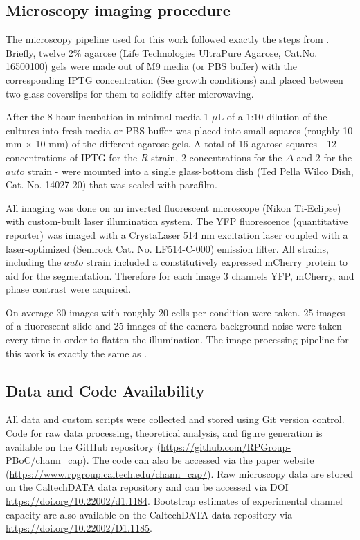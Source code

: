 \subsection{Microscopy imaging procedure}

The microscopy pipeline used for this work followed exactly the steps from
\cite{Razo-Mejia2018}. Briefly, twelve 2\% agarose (Life Technologies UltraPure
Agarose, Cat.No. 16500100) gels were made out of M9 media (or PBS buffer) with
the corresponding IPTG concentration (See growth conditions) and placed between
two glass coverslips for them to solidify after microwaving.

After the 8 hour incubation in minimal media 1 $\mu$L of a 1:10 dilution of the
cultures into fresh media or PBS buffer was placed into small squares (roughly
10 mm $\times$ 10 mm) of the different agarose gels. A total of 16 agarose
squares - 12 concentrations of IPTG for the $R$ strain, 2 concentrations for
the $\Delta$ and 2 for the $auto$ strain - were mounted into a single
glass-bottom dish (Ted Pella Wilco Dish, Cat. No. 14027-20) that was sealed
with parafilm.

All imaging was done on an inverted fluorescent microscope (Nikon Ti-Eclipse)
with custom-built laser illumination system. The YFP fluorescence (quantitative
reporter) was imaged with a CrystaLaser 514 nm excitation laser coupled with a
laser-optimized (Semrock Cat. No. LF514-C-000) emission filter. All strains,
including the $auto$ strain included a constitutively expressed mCherry protein
to aid for the segmentation. Therefore for each image 3 channels YFP, mCherry,
and phase contrast were acquired.

On average 30 images with roughly 20 cells per condition were taken. 25 images
of a fluorescent slide and 25 images of the camera background noise were taken
every time in order to flatten the illumination. The image  processing pipeline
for this work is exactly the same as \cite{Razo-Mejia2018}.

\subsection{Data and Code Availability}

All data and custom scripts were collected and stored using Git version
control. Code for raw data processing, theoretical analysis, and figure
generation is available on the GitHub repository
(\url{https://github.com/RPGroup-PBoC/chann_cap}). The code can also be
accessed via the paper website
(\url{https://www.rpgroup.caltech.edu/chann_cap/}). Raw microscopy data are
stored on the CaltechDATA data repository and can be accessed via DOI
\url{https://doi.org/10.22002/d1.1184}. Bootstrap estimates of experimental
channel capacity are also available on the CaltechDATA data repository via
\url{https://doi.org/10.22002/D1.1185}.
